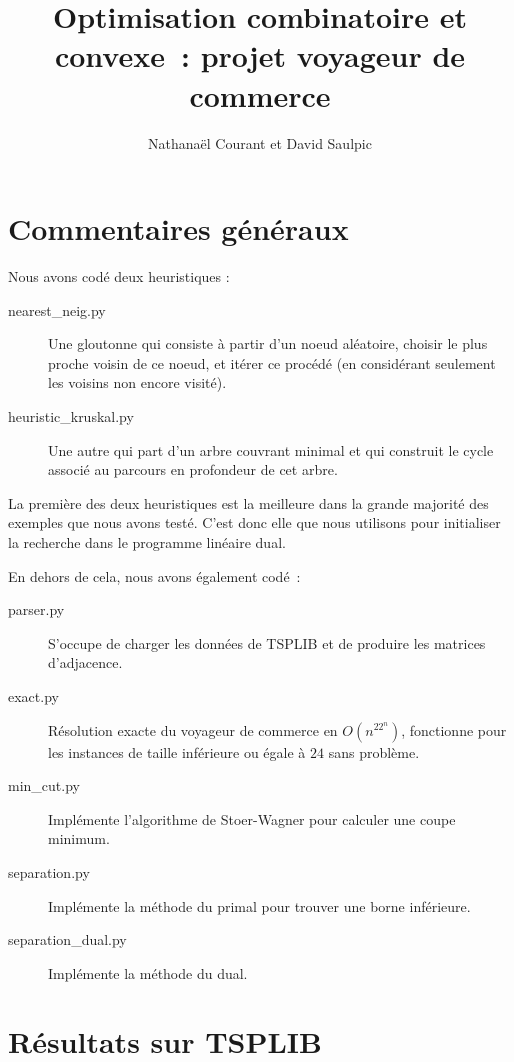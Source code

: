 \documentclass[a4paper,10pt]{article}
\title{Optimisation combinatoire et convexe~: projet voyageur de commerce}
\author{Nathanaël Courant et David Saulpic}
\date{}
\begin{document}
\maketitle

\section{Commentaires généraux}
Nous avons codé deux heuristiques : 

\begin{description}
\item[nearest\_neig.py] Une gloutonne qui consiste à partir d'un noeud aléatoire, choisir le plus proche voisin de ce noeud, et itérer ce procédé (en considérant seulement les voisins non encore visité).

\item[heuristic\_kruskal.py] Une autre qui part d'un arbre couvrant minimal et qui construit le cycle associé au parcours en profondeur de cet arbre.

\end{description}
La première des deux heuristiques est la meilleure dans la grande majorité des exemples que nous avons testé. C'est donc elle que nous utilisons pour initialiser la recherche dans le programme linéaire dual.

En dehors de cela, nous avons également codé~:
\begin{description}
\item[parser.py] S'occupe de charger les données de TSPLIB et de produire les matrices d'adjacence.
\item[exact.py] Résolution exacte du voyageur de commerce en $O(n^22^n)$, fonctionne pour les instances de taille inférieure ou égale à $24$ sans problème.
\item[min\_cut.py] Implémente l'algorithme de Stoer-Wagner pour calculer une coupe minimum.
\item[separation.py] Implémente la méthode du primal pour trouver une borne inférieure.
\item[separation\_dual.py] Implémente la méthode du dual.
\end{description}

\section{Résultats sur TSPLIB}
\end{document}
